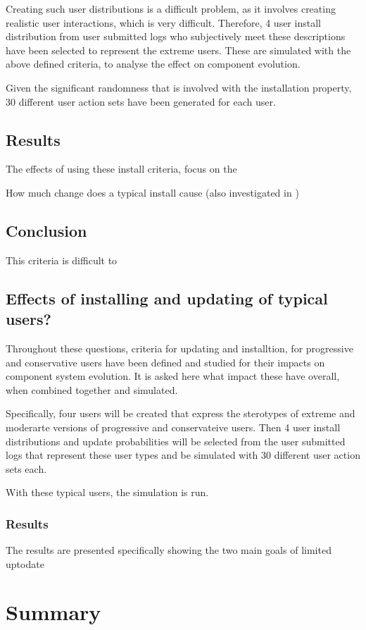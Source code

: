 Creating such user distributions is a difficult problem, as it involves creating realistic user interactions, which is very difficult.
Therefore, 4 user install distribution from user submitted logs who subjectively meet these descriptions have been selected to represent the extreme users.
These are simulated with the above defined criteria, to analyse the effect on component evolution.

Given the significant randomness that is involved with the installation property, 30 different user action sets have been generated for each user.


\subsection{Results}
The effects of using these install criteria, focus on the 

How much change does a typical install cause (also investigated in \citep{Jenson2010})

\subsection{Conclusion}
This criteria is difficult to 

\subsection{Effects of installing and updating of typical users?}
Throughout these questions, criteria for updating and installtion, for progressive and conservative users have been defined and studied for their impacts on component system evolution.
It is asked here what impact these have overall, when combined together and simulated.

Specifically, four users will be created that express the sterotypes of extreme and moderarte versions of progressive and conservateive users.
Then 4 user install distributions and update probabilities will be selected from the user submitted logs that represent these user types and be simulated with 30 different user action sets each.

With these typical users, the simulation is run.
\subsubsection{Results}
The results are presented specifically showing the two main goals of limited uptodate

\section{Summary}
